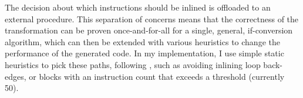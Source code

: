 \noindent
The decision about which  instructions should be inlined is offloaded
to an external procedure.
This separation of concerns means that the correctness of the transformation can
be proven once-and-for-all for a single, general, if-conversion algorithm, which
can then be extended with various heuristics to change the performance of the
generated code.  In my implementation, I use simple static heuristics to pick
these paths, following \textcite{ball93_branc_predic_free}, such as avoiding
inlining loop back-edges, or blocks with an instruction count that exceeds a
threshold (currently
50). %






%

